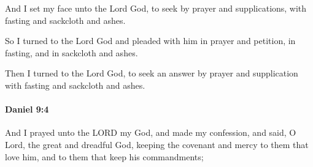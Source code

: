 			\begin{versebox}
					\item[BHS] 
					\item[LXX] 
					\item[ASV] And I set my face unto the Lord God, to seek by prayer and supplications, with fasting and sackcloth and ashes.
					\item[NIV] So I turned to the Lord God and pleaded with him in prayer and petition, in fasting, and in sackcloth and ashes.
					\item[NRSV] Then I turned to the Lord God, to seek an answer by prayer and supplication with fasting and sackcloth and ashes.
			\end{versebox}

		\paragraph{Daniel 9:4} %
			\label{DANIEL-9-4}

			And I prayed unto the LORD my God, and made my confession, and said, O Lord, the great and dreadful God, keeping the covenant and mercy to them that love him, and to them that keep his commandments;

